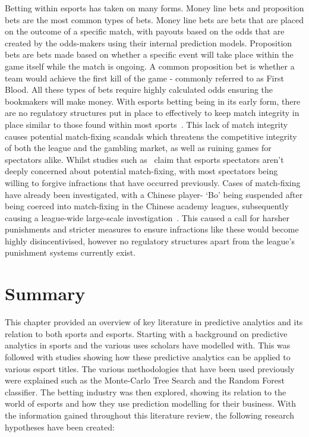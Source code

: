 Betting within esports has taken on many forms.
Money line bets and proposition bets are the most common types of bets.
Money line bets are bets that are placed on the outcome of a specific match, with payouts based on the odds that are created by the odds-makers using their internal prediction models.
Proposition bets are bets made based on whether a specific event will take place within the game itself while the match is ongoing.
A common proposition bet is whether a team would achieve the first kill of the game - commonly referred to as First Blood.
All these types of bets require highly calculated odds ensuring the bookmakers will make money.
With esports betting being in its early form, there are no regulatory structures put in place to effectively to keep match integrity in place similar to those found within most sports~\citep{dos2017q}.
This lack of match integrity causes potential match-fixing scandals which threatens the competitive integrity of both the league and the gambling market, as well as ruining games for spectators alike.
Whilst studies such as~\citet{abarbanel2019esports} claim that esports spectators aren't deeply concerned about potential match-fixing, with most spectators being willing to forgive infractions that have occurred previously.
Cases of match-fixing have already been investigated, with a Chinese player- `Bo' being suspended after being coerced into match-fixing in the Chinese academy leagues, subsequently causing a league-wide large-scale investigation~\citep{heath2021matchfixing}.
This caused a call for harsher punishments and stricter measures to ensure infractions like these would become highly disincentivised, however no regulatory structures apart from the league's punishment systems currently exist.\\

\section{Summary}\label{sec:Summary}
This chapter provided an overview of key literature in predictive analytics and its relation to both sports and esports.
Starting with a background on predictive analytics in sports and the various uses scholars have modelled with.
This was followed with studies showing how these predictive analytics can be applied to various esport titles.
The various methodologies that have been used previously were explained such as the Monte-Carlo Tree Search and the Random Forest classifier.
The betting industry was then explored, showing its relation to the world of esports and how they use prediction modelling for their business.
With the information gained throughout this literature review, the following research hypotheses have been created:

